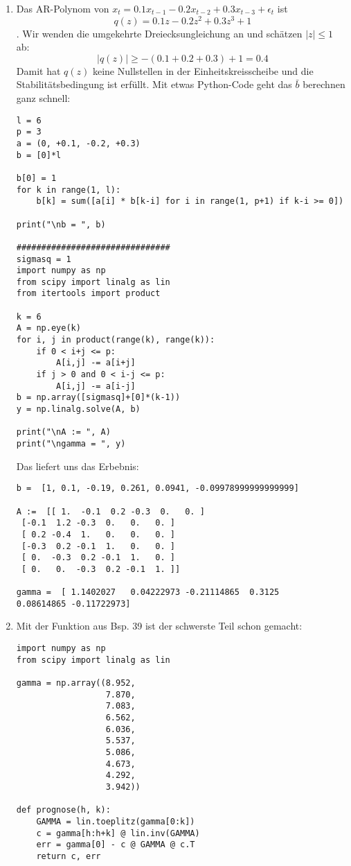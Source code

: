 \documentclass[a4paper,11pt,notitlepage,fullpage]{article}
\begin{document}
\begin{enumerate}
\item Das AR-Polynom von $x_t = 0.1 x_{t-1} - 0.2 x_{t-2} + 0.3 x_{t-3} + \epsilon_t$ ist $$q(z) = 0.1 z - 0.2 z^2 + 0.3 z^3 + 1$$.
Wir wenden die umgekehrte Dreiecksungleichung an und schätzen $|z| \leq 1$ ab:
$$|q(z)| \geq -(0.1 + 0.2 + 0.3) + 1 = 0.4$$
Damit hat $q(z)$ keine Nullstellen in der Einheitskreisscheibe und die Stabilitätsbedingung ist erfüllt. Mit etwas Python-Code geht das $\bar b$ berechnen ganz schnell:
\begin{verbatim}
l = 6
p = 3
a = (0, +0.1, -0.2, +0.3)
b = [0]*l

b[0] = 1
for k in range(1, l):
    b[k] = sum([a[i] * b[k-i] for i in range(1, p+1) if k-i >= 0])

print("\nb = ", b)

###############################
sigmasq = 1
import numpy as np
from scipy import linalg as lin
from itertools import product

k = 6
A = np.eye(k)
for i, j in product(range(k), range(k)):
    if 0 < i+j <= p:
        A[i,j] -= a[i+j]
    if j > 0 and 0 < i-j <= p:
        A[i,j] -= a[i-j] 
b = np.array([sigmasq]+[0]*(k-1))
y = np.linalg.solve(A, b)

print("\nA := ", A)
print("\ngamma = ", y)
\end{verbatim}
Das liefert uns das Erbebnis:
\begin{verbatim}
b =  [1, 0.1, -0.19, 0.261, 0.0941, -0.09978999999999999]

A :=  [[ 1.  -0.1  0.2 -0.3  0.   0. ]
 [-0.1  1.2 -0.3  0.   0.   0. ]      
 [ 0.2 -0.4  1.   0.   0.   0. ]      
 [-0.3  0.2 -0.1  1.   0.   0. ]      
 [ 0.  -0.3  0.2 -0.1  1.   0. ]
 [ 0.   0.  -0.3  0.2 -0.1  1. ]]

gamma =  [ 1.1402027   0.04222973 -0.21114865  0.3125      0.08614865 -0.11722973]
\end{verbatim}


\item Mit der Funktion aus Bsp. 39 ist der schwerste Teil schon gemacht:
\begin{verbatim}
import numpy as np
from scipy import linalg as lin

gamma = np.array((8.952,
                  7.870,
                  7.083,
                  6.562,
                  6.036,
                  5.537,
                  5.086,
                  4.673,
                  4.292,
                  3.942))

def prognose(h, k):
    GAMMA = lin.toeplitz(gamma[0:k])
    c = gamma[h:h+k] @ lin.inv(GAMMA)
    err = gamma[0] - c @ GAMMA @ c.T
    return c, err


\end{verbatim}
\end{enumerate}
\end{document}

